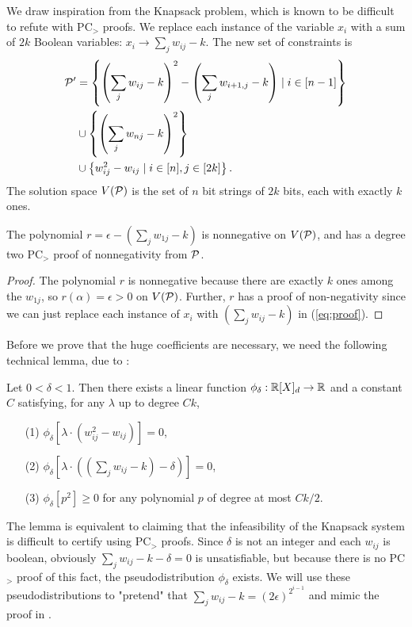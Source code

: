 We draw inspiration from the Knapsack problem, which is known to be difficult to refute with PC$_>$ proofs. We replace each instance of the variable $x_i$ with a sum of $2k$ Boolean variables: $x_i \rightarrow \sum_j w_{ij} - k$. The new set of constraints is
\begin{align*}
\mathcal P' &= \left\{\left(\sum_j w_{ij} - k\right)^2 - \left(\sum_j w_{i+1,j} - k\right) \mid i \in [n-1]\right\} \\
&\cup \left\{\left(\sum_j w_{nj} - k\right)^2 \right\} \\
&\cup \left\{w_{ij}^2 - w_{ij} \mid i \in [n], j \in [2k]\right\}.
\end{align*}
The solution space $V(\mathcal P)$ is the set of $n$ bit strings of $2k$ bits, each with exactly $k$ ones.
\begin{lemma}\label{lem:boolean-degtwoproof}
The polynomial $r = \epsilon - \left(\sum_j w_{1j} - k\right)$ is nonnegative on $V(\mathcal P)$, and has a degree two PC$_>$ proof of nonnegativity from $\mathcal P$.
\end{lemma}
\begin{proof}
The polynomial $r$ is nonnegative because there are exactly $k$ ones among the $w_{1j}$, so $r(\alpha) = \epsilon > 0$ on $V(\mathcal P)$.
Further, $r$ has a proof of non-negativity since we can just replace each instance of $x_i$ with $\left(\sum_j w_{ij} - k\right)$ in (\ref{eq:proof}). 
\end{proof}

Before we prove that the huge coefficients are necessary, we need the following technical lemma, due to \cite{}:
\begin{lemma}\label{lem:knapsack-pd}
Let $0 < \delta < 1$. Then there exists a linear function $\phi_\delta: \mathbb R[X]_d \rightarrow \mathbb R$ and a constant $C$ satisfying, for any $\lambda$ up to degree $Ck$,
\begin{enumerate}
\item[(1)] $\phi_\delta[\lambda\cdot(w_{ij}^2 - w_{ij})] = 0$,
\item[(2)] $\phi_\delta[\lambda\cdot((\sum_j w_{ij} - k) - \delta)] = 0$,
\item[(3)] $\phi_\delta[p^2] \geq 0$ for any polynomial $p$ of degree at most $Ck/2$.
\end{enumerate}
\end{lemma}
The lemma is equivalent to claiming that the infeasibility of the Knapsack system is difficult to certify using PC$_>$ proofs. Since $\delta$ is not an integer and each $w_{ij}$ is boolean, obviously $\sum_j w_{ij} - k - \delta = 0$ is unsatisfiable, but because there is no PC$_>$ proof of this fact, the pseudodistribution $\phi_\delta$ exists. We will use these pseudodistributions to "pretend" that $\sum_j w_{ij} - k = (2\epsilon)^{2^{i-1}}$ and mimic the proof in .

